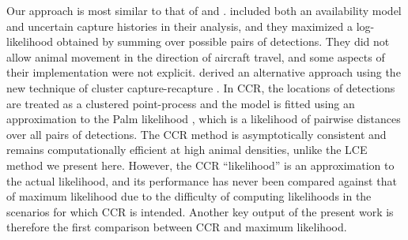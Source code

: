 \documentclass[useAMS, usenatbib, referee]{biom}\usepackage[]{graphicx}\usepackage[]{color}
\begin{document}
Our approach is most similar to that of \cite{Hiby+Lovell:98} and \cite{Stevenson+al:19}.  \cite{Hiby+Lovell:98} included both an availability model and uncertain capture histories in their analysis, and they maximized a log-likelihood obtained by summing over possible pairs of detections. They did not allow animal movement in the direction of aircraft travel, and some aspects of their implementation were not explicit. \cite{Stevenson+al:19} derived an alternative approach using the new technique of cluster capture-recapture \citep[CCR; see ][]{Fewster+al:16}. In CCR, the locations of detections are treated as a clustered point-process and the model is fitted using an approximation to the Palm likelihood \citep{Tanaka+al:08}, which is a likelihood of pairwise distances over all pairs of detections.
The CCR method is asymptotically consistent and remains computationally efficient at high animal densities, unlike the LCE method we present here. However, the CCR ``likelihood'' is an approximation to the actual likelihood, and its performance has never been compared against that of maximum likelihood due to the difficulty of computing likelihoods in the scenarios for which CCR is intended. Another key output of the present work is therefore the first comparison between CCR and maximum likelihood.


\end{document}
